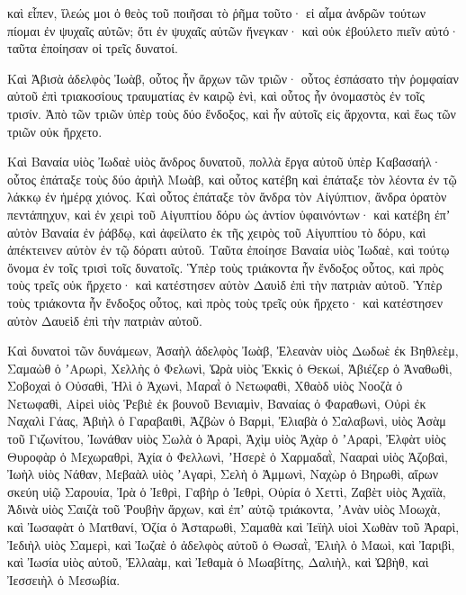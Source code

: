{καὶ εἶπεν, ἵλεώς μοι ὁ θεὸς τοῦ ποιῆσαι τὸ ῥῆμα τοῦτο· εἰ αἷμα ἀνδρῶν τούτων πίομαι ἐν ψυχαῖς αὐτῶν; ὅτι ἐν ψυχαῖς αὐτῶν ἤνεγκαν· καὶ οὐκ ἐβούλετο πιεῖν αὐτό· ταῦτα ἐποίησαν οἱ τρεῖς δυνατοί.
\par }{\PP {}Καὶ Ἀβισὰ ἀδελφὸς Ἰωὰβ, οὗτος ἦν ἄρχων τῶν τριῶν· οὗτος ἐσπάσατο τὴν ῥομφαίαν αὐτοῦ ἐπὶ τριακοσίους τραυματίας ἐν καιρῷ ἑνὶ, καὶ οὗτος ἦν ὀνομαστὸς ἐν τοῖς τρισίν.
Ἀπὸ τῶν τριῶν ὑπὲρ τοὺς δύο ἔνδοξος, καὶ ἦν αὐτοῖς εἰς ἄρχοντα, καὶ ἕως τῶν τριῶν οὐκ ἤρχετο.
\par }{\PP {}Καὶ Βαναία υἱὸς Ἰωδαὲ υἱὸς ἄνδρος δυνατοῦ, πολλὰ ἔργα αὐτοῦ ὑπὲρ Καβασαήλ· οὗτος ἐπάταξε τοὺς δύο ἀριὴλ Μωὰβ, καὶ οὗτος κατέβη καὶ ἐπάταξε τὸν λέοντα ἐν τῷ λάκκῳ ἐν ἡμέρᾳ χιόνος.
Καὶ οὗτος ἐπάταξε τὸν ἄνδρα τὸν Αἰγύπτιον, ἄνδρα ὁρατὸν πεντάπηχυν, καὶ ἐν χειρὶ τοῦ Αἰγυπτίου δόρυ ὡς ἀντίον ὑφαινόντων· καὶ κατέβη ἐπʼ αὐτὸν Βαναία ἐν ῥάβδῳ, καὶ ἀφείλατο ἐκ τῆς χειρὸς τοῦ Αἰγυπτίου τὸ δόρυ, καὶ ἀπέκτεινεν αὐτὸν ἐν τῷ δόρατι αὐτοῦ.
Ταῦτα ἐποίησε Βαναία υἱὸς Ἰωδαὲ, καὶ τούτῳ ὄνομα ἐν τοῖς τρισὶ τοῖς δυνατοῖς. Ὑπὲρ τοὺς τριάκοντα ἦν ἔνδοξος οὗτος, καὶ πρὸς τοὺς τρεῖς οὐκ ἤρχετο· καὶ κατέστησεν αὐτὸν Δαυὶδ ἐπὶ τὴν πατριὰν αὐτοῦ.
Ὑπὲρ τοὺς τριάκοντα ἦν ἔνδοξος οὗτος, καὶ πρὸς τοὺς τρεῖς οὐκ ἤρχετο· καὶ κατέστησεν αὐτὸν Δαυεὶδ ἐπὶ τὴν πατριὰν αὐτοῦ.
\par }{\PP {}Καὶ δυνατοὶ τῶν δυνάμεων, Ἀσαὴλ ἀδελφὸς Ἰωὰβ, Ἐλεανὰν υἱὸς Δωδωὲ ἐκ Βηθλεὲμ,
Σαμαὼθ ὁ ʼΑρωρὶ, Χελλὴς ὁ Φελωνὶ,
Ὠρὰ υἱὸς Ἐκκὶς ὁ Θεκωί, Ἀβιέζερ ὁ Ἀναθωθὶ,
Σοβοχαὶ ὁ Οὐσαθὶ, Ἠλὶ ὁ Ἀχωνὶ,
Μαραῒ ὁ Νετωφαθὶ, Χθαὸδ υἱὸς Νοοζὰ ὁ Νετωφαθὶ,
Αἰρεὶ υἱὸς Ῥεβιὲ ἐκ βουνοῦ Βενιαμὶν, Βαναίας ὁ Φαραθωνὶ,
Οὐρὶ ἐκ Ναχαλὶ Γάας, Ἀβιὴλ ὁ Γαραβαιθὶ,
Ἀζβὼν ὁ Βαρμὶ, Ἐλιαβὰ ὁ Σαλαβωνὶ,
υἱὸς Ἀσὰμ τοῦ Γιζωνίτου, Ἰωνάθαν υἱὸς Σωλὰ ὁ Ἀραρὶ,
Ἀχὶμ υἱὸς Ἀχὰρ ὁ ʼΑραρὶ, Ἐλφὰτ υἱὸς Θυροφὰρ
ὁ Μεχωραθρὶ, Ἀχία ὁ Φελλωνὶ,
ʼΗσερὲ ὁ Χαρμαδαῒ, Νααραὶ υἱὸς Ἀζοβαὶ,
Ἰωὴλ υἱὸς Νάθαν, Μεβαὰλ υἱὸς ʼΑγαρὶ,
Σελὴ ὁ Ἀμμωνὶ, Ναχὼρ ὁ Βηρωθὶ, αἴρων σκεύη υἱῷ Σαρουία,
Ἰρὰ ὁ Ἰεθρὶ, Γαβὴρ ὁ Ἰεθρὶ,
Οὐρία ὁ Χεττὶ, Ζαβὲτ υἱὸς Ἀχαϊὰ,
Ἀδινὰ υἱὸς Σαιζὰ τοῦ Ῥουβὴν ἄρχων, καὶ ἐπʼ αὐτῷ τριάκοντα,
ʼΑνὰν υἱὸς Μοωχὰ, καὶ Ἰωσαφὰτ ὁ Ματθανί,
Ὀζία ὁ Ἀσταρωθὶ, Σαμαθὰ καὶ Ἰεϊὴλ υἱοὶ Χωθὰν τοῦ Ἀραρὶ,
Ἰεδιὴλ υἱὸς Σαμερὶ, καὶ Ἰωζαὲ ὁ ἀδελφὸς αὐτοῦ ὁ Θωσαῒ,
Ἐλιὴλ ὁ Μαωὶ, καὶ Ἰαριβὶ, καὶ Ἰωσία υἱὸς αὐτοῦ, Ἐλλαὰμ, καὶ Ἰεθαμὰ ὁ Μωαβίτης,
Δαλιὴλ, καὶ Ὠβὴθ, καὶ Ἰεσσειὴλ ὁ Μεσωβία.

}
